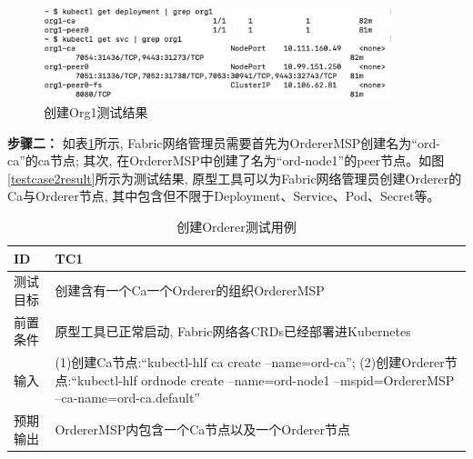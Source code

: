 \begin{figure}[h] %
    \centering %
    \includegraphics[width=0.9\textwidth]{FIGs/chapter5/peer.png} %
    \caption{创建Org1测试结果} %
    \label{testcase1result} %
\end{figure}%

\newpage


\textbf{步骤二：} 如表\ref{orderer_test}所示, Fabric网络管理员需要首先为OrdererMSP创建名为“ord-ca”的ca节点; 其次, 在OrdererMSP中创建了名为“ord-node1”的peer节点。如图\ref{testcase2result}所示为测试结果, 原型工具可以为Fabric网络管理员创建Orderer的Ca与Orderer节点, 其中包含但不限于Deployment、Service、Pod、Secret等。

{\footnotesize
\begin{longtable}[h]{m{60pt}|m{280pt}}
    \caption[创建Orderer测试用例]{创建Orderer测试用例} \label{orderer_test}\\
        \hline  
        ID&TC1\\
        \hline
        测试目标&创建含有一个Ca一个Orderer的组织OrdererMSP\\
        \hline
        前置条件&原型工具已正常启动, Fabric网络各CRDs已经部署进Kubernetes\\
        \hline
        输入& (1)创建Ca节点:“kubectl-hlf ca create --name=ord-ca”;
        \newline (2)创建Orderer节点:“kubectl-hlf ordnode create --name=ord-node1 --mspid=OrdererMSP --ca-name=ord-ca.default” \\

        \hline 
        预期输出& OrdererMSP内包含一个Ca节点以及一个Orderer节点\\
        \hline
    \end{longtable} 
}

